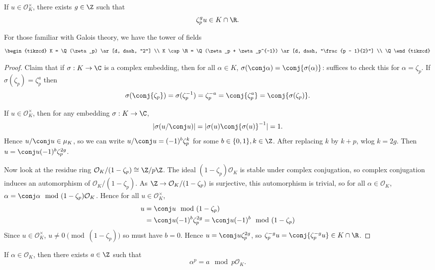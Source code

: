 \documentclass[a4paper]{article}
\renewcommand*{\O}{\mathcal{O}}
\begin{document}
\begin{lemma}[Kummer]
  If \(u \in \O_K^\times\), there exists \(g \in \Z\) such that
  \[
    \zeta_p^g u \in K \cap \R.
  \]
\end{lemma}

For those familiar with Galois theory, we have the tower of fields
\[
  \begin{tikzcd}
    K = \Q(\zeta_p) \ar[d, dash, "2"] \\
    K \cap \R = \Q(\zeta_p + \zeta_p^{-1}) \ar[d, dash, "\frac{p - 1}{2}"] \\
    \Q
  \end{tikzcd}
\]

\begin{proof}
  Claim that if \(\sigma: K \to \C\) is a complex embedding, then for all \(\alpha \in K\), \(\sigma(\conj \alpha) = \conj{\sigma(\alpha)}\): suffices to check this for \(\alpha = \zeta_p\). If \(\sigma(\zeta_p) = \zeta_p^a\) then
  \[
    \sigma(\conj{\zeta_p}) = \sigma(\zeta_p^{-1}) = \zeta_p^{-a} = \conj{\zeta_p^a} = \conj{\sigma(\zeta_p)}.
  \]

  If \(u \in \O_K^\times\), then for any embedding \(\sigma: K \to \C\),
  \[
    |\sigma(u/\conj u)| = |\sigma(u) \conj{\sigma(u)}^{-1}| = 1.
  \]
  Hence \(u/\conj u \in \mu_K\), so we can write \(u/\conj u = (-1)^b \zeta_p^k\) for some \(b \in \{0, 1\}, k \in \Z\). After replacing \(k\) by \(k + p\), wlog \(k = 2g\). Then \(u = \conj u (-1)^b \zeta_p^{2g}\).

  Now look at the residue ring \(\O_K/(1 - \zeta_p) \cong \Z/p\Z\). The ideal \((1 - \zeta_p)\O_K\) is stable under complex conjugation, so complex conjugation induces an automorphism of \(\O_K/(1 - \zeta_p)\). As \(\Z \to \O_K/(1 - \zeta_p)\) is surjective, this automorphism is trivial, so for all \(\alpha \in \O_K\), \(\alpha = \conj \alpha \mod{(1 - \zeta_p)\O_K}\). Hence for all \(u \in \O_K^\times\),
  \begin{align*}
    u &= \conj u \mod{(1 - \zeta_p)} \\
      &= \conj u (-1)^b \zeta_p^{2g} = \conj u (-1)^b \mod{(1 - \zeta_p)}
  \end{align*}
  Since \(u \in \O_K^\times\), \(u \neq 0 \pmod{(1 - \zeta_p)}\) so must have \(b = 0\). Hence \(u = \conj u \zeta_p^{2g}\), so \(\zeta_p^{-g} u = \conj{\zeta_p^{-g} u} \in K \cap \R\).
\end{proof}

\begin{lemma}
  If \(\alpha \in \O_K\), then there exists \(a \in \Z\) such that
  \[
    \alpha^p = a \mod{p\O_K}.
  \]
\end{lemma}
\end{document}
